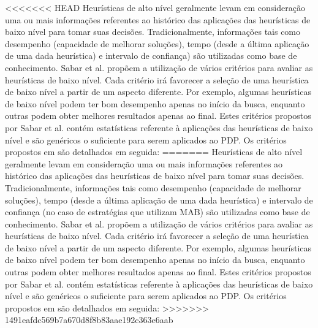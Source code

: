 <<<<<<< HEAD
Heurísticas de alto nível geralmente levam em consideração uma ou mais informações referentes ao histórico das aplicações das heurísticas de baixo nível para tomar suas decisões. Tradicionalmente, informações tais como desempenho (capacidade de melhorar soluções), tempo (desde a última aplicação de uma dada heurística) e intervalo de confiança) são utilizadas como base de conhecimento.  Sabar et al. \cite{sabar2015automatic} propõem a utilização de vários critérios para avaliar as heurísticas de baixo nível. Cada critério irá favorecer a seleção de uma heurística de baixo nível a partir de um aspecto diferente. Por exemplo, algumas heurísticas de baixo nível podem ter bom desempenho apenas no início da busca, enquanto outras podem obter melhores resultados apenas ao final. Estes critérios propostos por Sabar et al. contém estatísticas referente à aplicações das heurísticas de baixo nível e são genéricos o suficiente para serem aplicados ao PDP. Os critérios propostos em \cite{sabar2015automatic} são detalhados em seguida:
=======
Heurísticas de alto nível geralmente levam em consideração uma ou mais informações referentes ao histórico das aplicações das heurísticas de baixo nível para tomar suas decisões. Tradicionalmente, informações tais como desempenho (capacidade de melhorar soluções), tempo (desde a última aplicação de uma dada heurística) e intervalo de confiança (no caso de estratégias que utilizam MAB) são utilizadas como base de conhecimento.  Sabar et al. \cite{sabar2015automatic} propõem a utilização de vários critérios para avaliar as heurísticas de baixo nível. Cada critério irá favorecer a seleção de uma heurística de baixo nível a partir de um aspecto diferente. Por exemplo, algumas heurísticas de baixo nível podem ter bom desempenho apenas no início da busca, enquanto outras podem obter melhores resultados apenas ao final. Estes critérios propostos por Sabar et al. contém estatísticas referente à aplicações das heurísticas de baixo nível e são genéricos o suficiente para serem aplicados ao PDP. Os critérios propostos em \cite{sabar2015automatic} são detalhados em seguida:
>>>>>>> 1491eafdc569b7a670d8f8b83aae192c363e6aab



